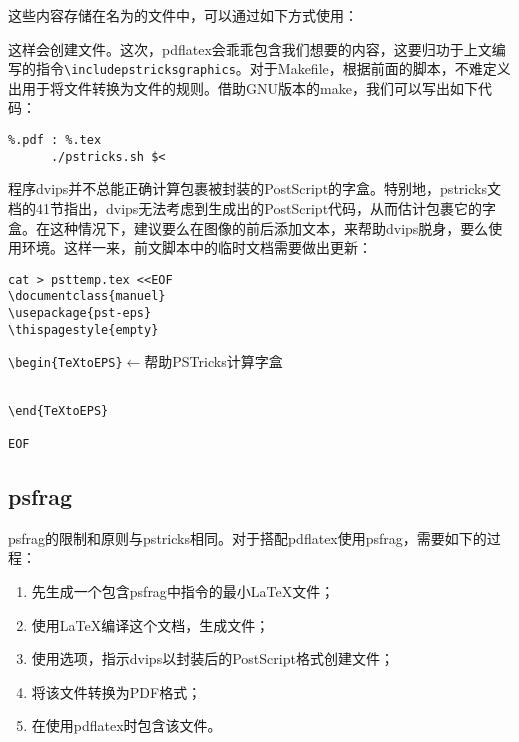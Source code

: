 这些内容存储在名为的文件中，可以通过如下方式使用：


这样会创建文件。这次，\textsf{pdflatex}会乖乖包含我们想要的内容，这要归功于上文编写的指令\verb+\includepstricksgraphics+。对于Makefile，根据前面的脚本，不难定义出用于将文件转换为文件的规则。借助GNU版本的\textsf{make}，我们可以写出如下代码：

\begin{dmd}
\begin{verbatim}
%.pdf : %.tex
      ./pstricks.sh $<\end{verbatim}
\end{dmd}

\begin{qquestion}
程序dvips并不总能正确计算包裹被封装的PostScript的字盒。特别地，pstricks文档的41节指出，dvips无法考虑到生成出的PostScript代码，从而估计包裹它的字盒。在这种情况下，建议要么在图像的前后添加文本，来帮助dvips脱身，要么使用环境。这样一来，前文脚本中的临时文档需要做出更新：

\begin{dmd}
\begin{verbatim}
cat > psttemp.tex <<EOF
\documentclass{manuel}
\usepackage{pst-eps}
\thispagestyle{empty}
\end{verbatim}
\verb+\begin{TeXtoEPS}+\quad$\leftarrow$\textsf{帮助PSTricks计算字盒}
\begin{verbatim}

\end{TeXtoEPS}

EOF\end{verbatim}
\end{dmd}
\end{qquestion}

\subsection{\textsf{psfrag}}

\textsf{psfrag}的限制和原则与\textsf{pstricks}相同。对于搭配\textsf{pdflatex}使用\textsf{psfrag}，需要如下的过程：

\begin{enumerate}
    \item 先生成一个包含\textsf{psfrag}中指令的最小\LaTeX 文件；
    \item 使用\LaTeX 编译这个文档，生成文件；
    \item 使用选项，指示\textsf{dvips}以封装后的PostScript格式创建文件；
    \item 将该文件转换为PDF格式；
    \item 在使用\textsf{pdflatex}时包含该文件。
\end{enumerate}

